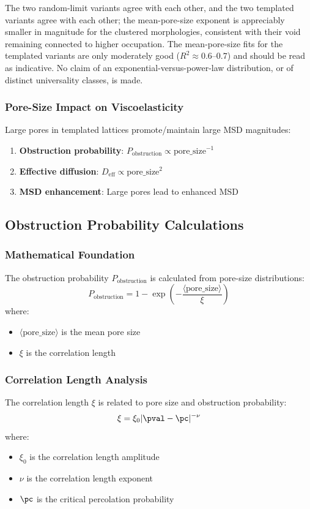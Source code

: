 The two random-limit variants agree with each other, and the two templated variants agree with each other; the mean-pore-size exponent is appreciably smaller in magnitude for the clustered morphologies, consistent with their void remaining connected to higher occupation. The mean-pore-size fits for the templated variants are only moderately good ($R^2 \approx 0.6$--$0.7$) and should be read as indicative. No claim of an exponential-versus-power-law distribution, or of distinct universality classes, is made.

\subsubsection{Pore-Size Impact on Viscoelasticity}
Large pores in templated lattices promote/maintain large MSD magnitudes:

\begin{enumerate}
    \item \textbf{Obstruction probability}: $P_{\text{obstruction}} \propto \text{pore\_size}^{-1}$
    \item \textbf{Effective diffusion}: $D_{\text{eff}} \propto \text{pore\_size}^2$
    \item \textbf{MSD enhancement}: Large pores lead to enhanced MSD
\end{enumerate}

\subsection{Obstruction Probability Calculations}

\subsubsection{Mathematical Foundation}
The obstruction probability $P_{\text{obstruction}}$ is calculated from pore-size distributions:
\begin{equation}
P_{\text{obstruction}} = 1 - \exp\left(-\frac{\langle \text{pore\_size} \rangle}{\xi}\right)
\end{equation}
where:
\begin{itemize}
    \item $\langle \text{pore\_size} \rangle$ is the mean pore size
    \item $\xi$ is the correlation length
\end{itemize}

\subsubsection{Correlation Length Analysis}
The correlation length $\xi$ is related to pore size and obstruction probability:
\begin{equation}
\xi = \xi_0 |\pval - \pc|^{-\nu}
\end{equation}
where:
\begin{itemize}
    \item $\xi_0$ is the correlation length amplitude
    \item $\nu$ is the correlation length exponent
    \item $\pc$ is the critical percolation probability
\end{itemize}

